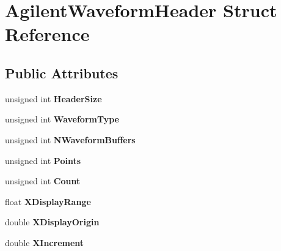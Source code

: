 \hypertarget{structAgilentWaveformHeader}{
\section{AgilentWaveformHeader Struct Reference}
\label{structAgilentWaveformHeader}
}
\subsection*{Public Attributes}
\begin{DoxyCompactItemize}
\item 
\hypertarget{structAgilentWaveformHeader_ac190599ff91db100b46b236f1da9ad6d}{
unsigned int {\bfseries HeaderSize}}
\label{structAgilentWaveformHeader_ac190599ff91db100b46b236f1da9ad6d}

\item 
\hypertarget{structAgilentWaveformHeader_aa875240b73b21ed12eba6fbcf8516df6}{
unsigned int {\bfseries WaveformType}}
\label{structAgilentWaveformHeader_aa875240b73b21ed12eba6fbcf8516df6}

\item 
\hypertarget{structAgilentWaveformHeader_a42742436db8928363256f50196cf10e8}{
unsigned int {\bfseries NWaveformBuffers}}
\label{structAgilentWaveformHeader_a42742436db8928363256f50196cf10e8}

\item 
\hypertarget{structAgilentWaveformHeader_abce6be535bc9a512412115759425f89d}{
unsigned int {\bfseries Points}}
\label{structAgilentWaveformHeader_abce6be535bc9a512412115759425f89d}

\item 
\hypertarget{structAgilentWaveformHeader_afba29009473b550d337be454c39a87b8}{
unsigned int {\bfseries Count}}
\label{structAgilentWaveformHeader_afba29009473b550d337be454c39a87b8}

\item 
\hypertarget{structAgilentWaveformHeader_ae296ad7db220f9a1e0f5c6a84c843b90}{
float {\bfseries XDisplayRange}}
\label{structAgilentWaveformHeader_ae296ad7db220f9a1e0f5c6a84c843b90}

\item 
\hypertarget{structAgilentWaveformHeader_aa5f8679aa9ea233d03ba14ebfe1b001c}{
double {\bfseries XDisplayOrigin}}
\label{structAgilentWaveformHeader_aa5f8679aa9ea233d03ba14ebfe1b001c}

\item 
\hypertarget{structAgilentWaveformHeader_af61e38130702196d2827577b6ea346b4}{
double {\bfseries XIncrement}}
\label{structAgilentWaveformHeader_af61e38130702196d2827577b6ea346b4}


\end{DoxyCompactItemize}
